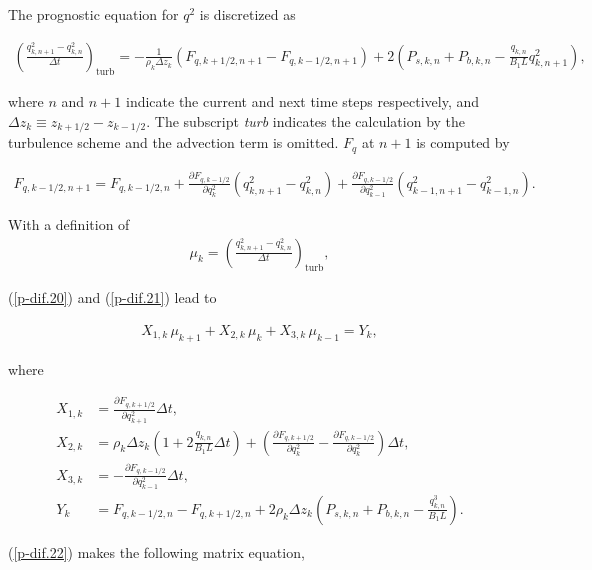 The prognostic equation for \(q^2\) is discretized as

\begin{eqnarray} \left(\frac{q^2_{k,n+1}-q^2_{k,n}}{\Delta t}\right)_{\text{turb}} = -\frac{1}{\rho_k\Delta z_k}\left(F_{q,k+1/2,n+1}-F_{q,k-1/2,n+1}\right) +2\left( P_{s,k,n} + P_{b,k,n} - \frac{q_{k,n}}{B_1L}q^2_{k,n+1}\right), \label{p-dif.20} \end{eqnarray}

where \(n\) and \(n+1\) indicate the current and next time steps respectively, and \(\Delta z_k \equiv z_{k+1/2}-z_{k-1/2}\). The subscript \emph{turb} indicates the calculation by the turbulence
scheme and the advection term is omitted. \(F_q\) at \(n+1\) is computed by

\begin{eqnarray} F_{q,k-1/2,n+1} = F_{q,k-1/2,n} + \frac{\partial F_{q,k-1/2}}{\partial q^2_k}(q^2_{k,n+1}-q^2_{k,n}) +  \frac{\partial F_{q,k-1/2}}{\partial q^2_{k-1}}(q^2_{k-1,n+1}-q^2_{k-1,n}). \label{p-dif.21} \end{eqnarray}

With a definition of \begin{eqnarray}\mu_k = \left(\frac{q^2_{k,n+1}-q^2_{k,n}}{\Delta t}\right)_{\text{turb}},\end{eqnarray}

(\ref{p-dif.20}) and (\ref{p-dif.21}) lead to

\begin{eqnarray}
 X_{1,k}\,\mu_{k+1}+X_{2,k}\,\mu_k+X_{3,k}\,\mu_{k-1} = Y_k, \label{p-dif.22}
\end{eqnarray}

where

\begin{align}
 X_{1,k} &= \frac{\partial F_{q,k+1/2}}{\partial q^2_{k+1}} \Delta t, \\
 X_{2,k} &= \rho_k \Delta z_k \left(1+2\frac{q_{k,n}}{B_1 L}\Delta t \right) + \left( \frac{\partial F_{q,k+1/2}}{\partial q^2_k} - \frac{\partial F_{q,k-1/2}}{\partial q^2_k} \right)\Delta t, \\
 X_{3,k} &= -\frac{\partial F_{q,k-1/2}}{\partial q^2_{k-1}} \Delta t, \\
 Y_k &= F_{q,k-1/2,n} - F_{q,k+1/2,n} + 2\rho_k \Delta z_k \left( P_{s,k,n} + P_{b,k,n} - \frac{q^3_{k,n}}{B_1 L} \right).
\end{align}

(\ref{p-dif.22}) makes the following matrix equation,


